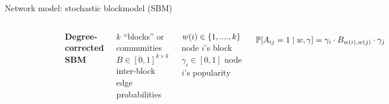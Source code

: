 \documentclass{beamer}
\theoremstyle{remark}
\DeclarePairedDelimiter{\set}{\{}{\}}
\DeclarePairedDelimiter{\brac}{[}{]}
\renewcommand{\P}[2][]{%
   \ifthenelse{ \equal{#1}{} }
      {\ensuremath{\mathbb{P} \brac*{#2}}}
      {\ensuremath{\mathbb{P} \brac*{#2 \mid #1}}}
}
\begin{document}
\begin{frame}{Network model: stochastic blockmodel (SBM)}
    \begin{columns}

        \begin{figure}
            \includegraphics[width=\textwidth]{figures/assortative.png}
        \end{figure}


        \textbf{Degree-corrected SBM}

        \vspace{4mm}

        $k$ ``blocks'' or communities
        $B \in [0, 1]^{k \times k}$ inter-block edge probabilities

        \vspace{3mm}

        $w(i) \in \set{1, ...., k}$ node $i$'s block
        $\gamma_i \in [0, 1]$ node $i$'s popularity

        \begin{align*}
            \P[w, \gamma]{A_{ij} = 1} = \gamma_i \cdot B_{w(i), w(j)} \cdot \gamma_j
        \end{align*}

    \end{columns}
\end{frame}
\end{document}
